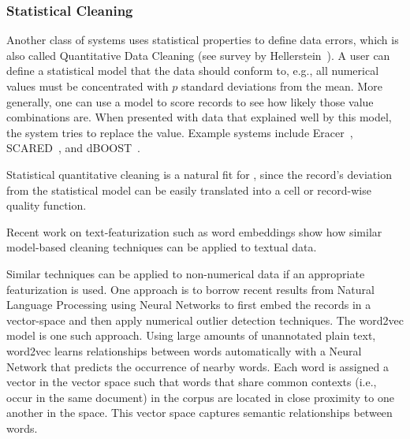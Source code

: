 \subsubsection{Statistical Cleaning}
Another class of systems uses statistical properties to define data errors, which is also called Quantitative Data Cleaning (see survey by Hellerstein~\cite{hellerstein2008quantitative}).
A user can define a statistical model that the data should conform to, e.g., all numerical values must be concentrated with $p$ standard deviations from the mean. 
More generally, one can use a model to score records to see how likely those value combinations are.
When presented with data that explained well by this model, the system tries to replace the value.
Example systems include Eracer~\cite{eracer}, SCARED~\cite{yakout2013don}, and dBOOST~\cite{pit2016outlier}.

Statistical quantitative cleaning is a natural fit for \sys, since the record's deviation from the statistical model can be easily translated into a cell or record-wise quality function.  


Recent work on text-featurization such as word embeddings show how similar model-based cleaning techniques can be applied to textual data.  


Similar techniques can be applied to non-numerical data if an appropriate featurization is used.
One approach is to borrow recent results from Natural Language Processing using Neural Networks to first embed the records in a vector-space and then apply numerical outlier detection techniques. The \textsf{word2vec} model \cite{mikolov2013distributed} is one such approach.
Using large amounts of unannotated plain text, \textsf{word2vec} learns relationships between words automatically with a Neural Network that predicts the occurrence of nearby words.
 Each word is assigned a vector in the vector space such that words that share common contexts (i.e., occur in the same document) in the corpus are located in close proximity to one another in the space.
 This vector space captures semantic relationships between words.
 

